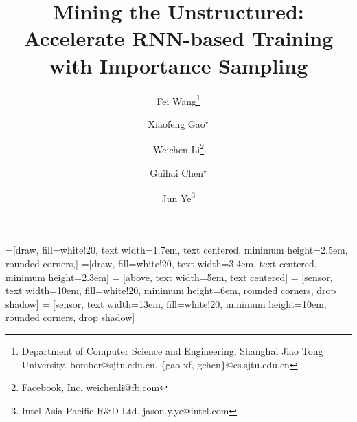 \documentclass[twoside,leqno,twocolumn]{article}
\begin{document}
=[draw, fill=white!20, text width=1.7em, 
text centered, minimum height=2.5em, rounded corners,]
=[draw, fill=white!20, text width=3.4em, 
text centered, minimum height=2.3em]
 = [above, text width=5em, text centered]
 = [sensor, text width=10em, fill=white!20, 
minimum height=6em, rounded corners, drop shadow]
 = [sensor, text width=13em, fill=white!20, 
minimum height=10em, rounded corners, drop shadow]

\title{\Large Mining the Unstructured: Accelerate RNN-based Training with Importance Sampling}
\author{Fei Wang\thanks{Department of Computer Science and Engineering, Shanghai Jiao Tong University. bomber@sjtu.edu.cn, \{gao-xf, gchen\}@cs.sjtu.edu.cn} \\
	\and
	Xiaofeng Gao$^{\star}$ \\
	\and
	Weichen Li\thanks{Facebook, Inc. weichenli@fb.com} \\
	\and
	Guihai Chen$^{\star}$ \\
	\and
	Jun Ye\thanks{Intel Asia-Pacific R\&D Ltd. jason.y.ye@intel.com}}
\date{}

\maketitle


\end{document}
